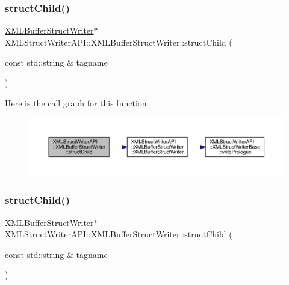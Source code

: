 \subsubsection{\texorpdfstring{structChild()}{structChild()}\hspace{0.1cm}{\footnotesize\ttfamily [2/3]}}
{\footnotesize\ttfamily \mbox{\hyperlink{classXMLStructWriterAPI_1_1XMLBufferStructWriter}{X\+M\+L\+Buffer\+Struct\+Writer}}$\ast$ X\+M\+L\+Struct\+Writer\+A\+P\+I\+::\+X\+M\+L\+Buffer\+Struct\+Writer\+::struct\+Child (\begin{DoxyParamCaption}\item[{const std\+::string \&}]{tagname }\end{DoxyParamCaption})\hspace{0.3cm}{\ttfamily [inline]}}

Here is the call graph for this function\+:
\nopagebreak
\begin{figure}[H]
\begin{center}
\leavevmode
\includegraphics[width=350pt]{d2/d0a/classXMLStructWriterAPI_1_1XMLBufferStructWriter_a1c5689221a56527dfd86ac071db3a534_cgraph}
\end{center}
\end{figure}
\mbox{\label{classXMLStructWriterAPI_1_1XMLBufferStructWriter_a1c5689221a56527dfd86ac071db3a534}} 
\subsubsection{\texorpdfstring{structChild()}{structChild()}\hspace{0.1cm}{\footnotesize\ttfamily [3/3]}}
{\footnotesize\ttfamily \mbox{\hyperlink{classXMLStructWriterAPI_1_1XMLBufferStructWriter}{X\+M\+L\+Buffer\+Struct\+Writer}}$\ast$ X\+M\+L\+Struct\+Writer\+A\+P\+I\+::\+X\+M\+L\+Buffer\+Struct\+Writer\+::struct\+Child (\begin{DoxyParamCaption}\item[{const std\+::string \&}]{tagname }\end{DoxyParamCaption})\hspace{0.3cm}{\ttfamily [inline]}}

